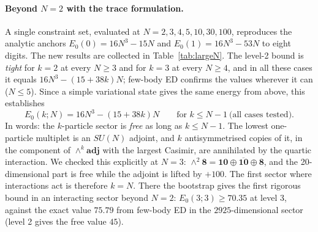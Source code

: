\documentclass[10pt]{article}
\begin{document}
\paragraph{Beyond $N=2$ with the trace formulation.}
A single constraint set, evaluated at $N=2,3,4,5,10,30,100$, reproduces the analytic anchors $E_0(0)=16N^3-15N$ and $E_0(1)=16N^3-53N$ to eight digits. The new results are collected in Table~\ref{tab:largeN}. The level-2 bound is \emph{tight} for $k=2$ at every $N\ge3$ and for $k=3$ at every $N\ge4$, and in all these cases it equals $16N^3-(15+38k)N$; few-body ED confirms the values wherever it can ($N\le5$). Since a simple variational state gives the same energy from above, this establishes
\begin{equation}
E_0(k;N)=16N^3-(15+38k)N\qquad\text{for }k\le N-1\ \text{(all cases tested)}.
\end{equation}
In words: the $k$-particle sector is \emph{free} as long as $k\le N-1$. The lowest one-particle multiplet is an $SU(N)$ adjoint, and $k$ antisymmetrised copies of it, in the component of $\wedge^k\mathbf{adj}$ with the largest Casimir, are annihilated by the quartic interaction. We checked this explicitly at $N=3$: $\wedge^2\mathbf 8=\mathbf{10}\oplus\overline{\mathbf{10}}\oplus\mathbf 8$, and the 20-dimensional part is free while the adjoint is lifted by $+100$. The first sector where interactions act is therefore $k=N$. There the bootstrap gives the first rigorous bound in an interacting sector beyond $N=2$: $E_0(3;3)\ge70.35$ at level 3, against the exact value $75.79$ from few-body ED in the $2925$-dimensional sector (level 2 gives the free value $45$).
\end{document}
